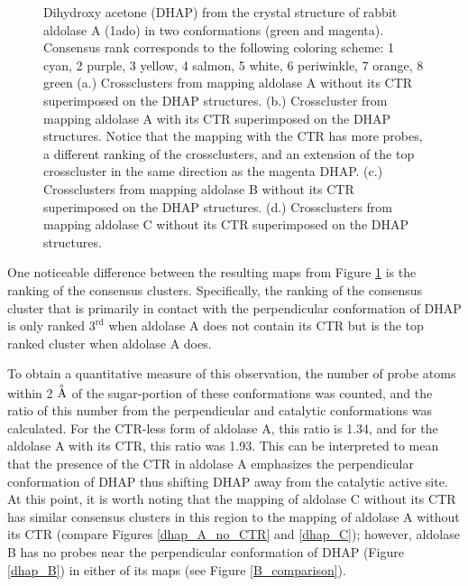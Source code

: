 \documentclass[11pt,a4paper]{article}
\begin{document}
\begin{figure}
\begin{center}
{                        
                }
                \caption{
			Dihydroxy acetone (DHAP) from the crystal structure of rabbit aldolase A (1ado) in two conformations (green and magenta).
			Consensus rank corresponds to the following coloring scheme:  1 cyan, 2 purple, 3 yellow,
			4 salmon, 5 white, 6 periwinkle, 7 orange, 8 green
			(a.)  Crossclusters from mapping aldolase A without its CTR superimposed on the DHAP structures.
			(b.)  Crosscluster from mapping aldolase A with its CTR superimposed on the DHAP structures.  Notice that the
			mapping with the CTR has more probes, a different ranking of the crossclusters, and an extension of the top crosscluster
			in the same direction as the magenta DHAP.
			(c.)  Crossclusters from mapping aldolase B without its CTR superimposed on the DHAP structures.  (d.)  Crossclusters from mapping 
			aldolase C without its CTR superimposed on the DHAP structures.
                }
                \label{CTR}
        \end{center}
\end{figure}

	One noticeable difference between the resulting maps from Figure \ref{CTR} is the ranking of the consensus clusters.  
	Specifically, the ranking of the consensus cluster that is primarily in contact with the perpendicular conformation of DHAP is only ranked $3^\mathrm{rd}$ when
	aldolase A does not contain its CTR but is the top ranked cluster when aldolase A does.  
	
	To obtain a quantitative measure of this observation, the number of probe atoms within 2 $\buildrel_{\circ}\over{\mathrm{A}}$
	of the sugar-portion of these conformations was counted, and the ratio of this number from the perpendicular and catalytic conformations was calculated.  
	For the CTR-less form of aldolase A, this ratio is 1.34, and for the aldolase A with its CTR, this ratio was 1.93.  This can be interpreted to mean that 
	the presence of the CTR in aldolase A emphasizes the perpendicular conformation of DHAP thus shifting DHAP away from the catalytic active site.  At this point, 
	it is worth noting that the mapping of aldolase C without its CTR has similar consensus clusters in this region 
	to the mapping of aldolase A without its CTR (compare Figures \ref{dhap_A_no_CTR} and \ref{dhap_C});
	 however, aldolase B has no probes near the perpendicular conformation of DHAP (Figure \ref{dhap_B}) in either of its maps 
	(see Figure \ref{B_comparison}).
\end{document}
